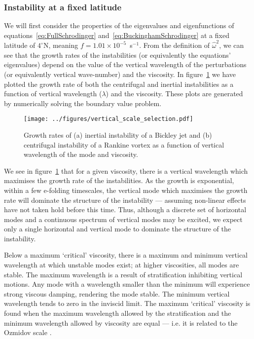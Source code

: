 \subsubsection{Instability at a fixed latitude}
We will first consider the properties of the eigenvalues and eigenfunctions of equations~\ref{eq:FullSchrodinger} and~\ref{eq:BuckinghamSchrodinger} at a fixed latitude of $4^\circ$N, meaning $f = 1.01 \times 10^{-5}$~s$^{-1}$. From the definition of $\hat{\omega}^2$, we can see that the growth rates of the instabilities (or equivalently the equations' eigenvalues) depend on the value of the vertical wavelength of the perturbations (or equivalently vertical wave-number) and the viscosity. In figure~\ref{fig:DispersionRelation} we have plotted the growth rate of both the centrifugal and inertial instabilities as a function of vertical wavelength ($\lambda$) and the viscosity. These plots are generated by numerically solving the boundary value problem.

\begin{figure}
    \centering
    \texttt{[image: ../figures/vertical\_scale\_selection.pdf]}
    \caption{Growth rates of (a) inertial instability of a Bickley jet and (b) centrifugal instability of a Rankine vortex as a function of vertical wavelength of the mode and viscosity.}
    \label{fig:DispersionRelation}
\end{figure}

We see in figure~\ref{fig:DispersionRelation} that for a given viscosity, there is a vertical wavelength which maximises the growth rate of the instabilities. As the growth is exponential, within a few e-folding timescales, the vertical mode which maximises the growth rate will dominate the structure of the instability --- assuming non-linear effects have not taken hold before this time. Thus, although a discrete set of horizontal modes and a continuous spectrum of vertical modes may be excited, we expect only a single horizontal and vertical mode to dominate the structure of the instability.

Below a maximum `critical' viscosity, there is a maximum and minimum vertical wavelength at which unstable modes exist; at higher viscosities, all modes are stable. The maximum wavelength is a result of stratification inhibiting vertical motions. Any mode with a wavelength smaller than the minimum will experience strong viscous damping, rendering the mode stable. The minimum vertical wavelength tends to zero in the inviscid limit. The maximum `critical' viscosity is found when the maximum wavelength allowed by the stratification and the minimum wavelength allowed by viscosity are equal --- i.e. it is related to the Ozmidov scale \citep{Ozmidov1965, OzmidovAMS}.

